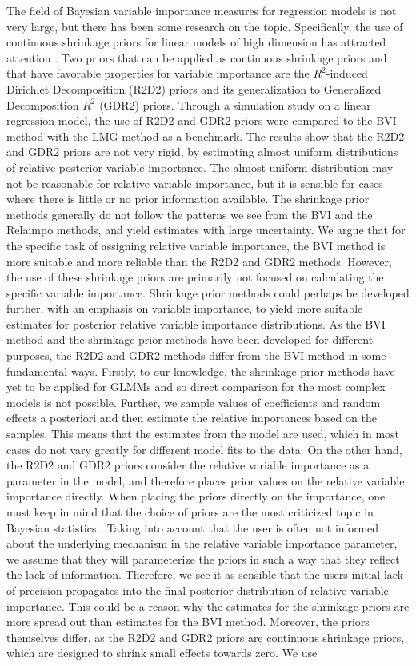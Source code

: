 The field of Bayesian variable importance measures for regression models is not very large, but there has been some research on the topic. Specifically, the use of continuous shrinkage priors for linear models of high dimension has attracted attention \citep{aguilar2024generalized}. Two priors that can be applied as continuous shrinkage priors and that have favorable properties for variable importance are the $R^2$-induced Dirichlet Decomposition (R2D2) priors \citep{zhang2020bayesian} and its generalization to Generalized Decomposition $R^2$ (GDR2) priors. Through a simulation study on a linear regression model, the use of R2D2 and GDR2 priors were compared to the BVI method with the LMG method as a benchmark. The results show that the R2D2 and GDR2 priors are not very rigid, by estimating almost uniform distributions of relative posterior variable importance. The almost uniform distribution may not be reasonable for relative variable importance, but it is sensible for cases where there is little or no prior information available. The shrinkage prior methods generally do not follow the patterns we see from the BVI and the Relaimpo methods, and yield estimates with large uncertainty. We argue that for the specific task of assigning relative variable importance, the BVI method is more suitable and more reliable than the R2D2 and GDR2 methods. However, the use of these shrinkage priors are primarily not focused on calculating the specific variable importance. Shrinkage prior methods could perhaps be developed further, with an emphasis on variable importance, to yield more suitable estimates for posterior relative variable importance distributions. As the BVI method and the shrinkage prior methods have been developed for different purposes, the R2D2 and GDR2 methods differ from the BVI method in some fundamental ways. Firstly, to our knowledge, the shrinkage prior methods have yet to be applied for GLMMs and so direct comparison for the most complex models is not possible. Further, we sample values of coefficients and random effects a posteriori and then estimate the relative importances based on the samples. This means that the estimates from the model are used, which in most cases do not vary greatly for different model fits to the data. On the other hand, the R2D2 and GDR2 priors consider the relative variable importance as a parameter in the model, and therefore places prior values on the relative variable importance directly. When placing the priors directly on the importance, one must keep in mind that the choice of priors are the most criticized topic in Bayesian statistics \citep{robert2007bayesian}. Taking into account that the user is often not informed about the underlying mechanism in the relative variable importance parameter, we assume that they will parameterize the priors in such a way that they reflect the lack of information. Therefore, we see it as sensible that the users initial lack of precision propagates into the final posterior distribution of relative variable importance. This could be a reason why the estimates for the shrinkage priors are more spread out than estimates for the BVI method. Moreover, the priors themselves differ, as the R2D2 and GDR2 priors are continuous shrinkage priors, which are designed to shrink small effects towards zero. We use 